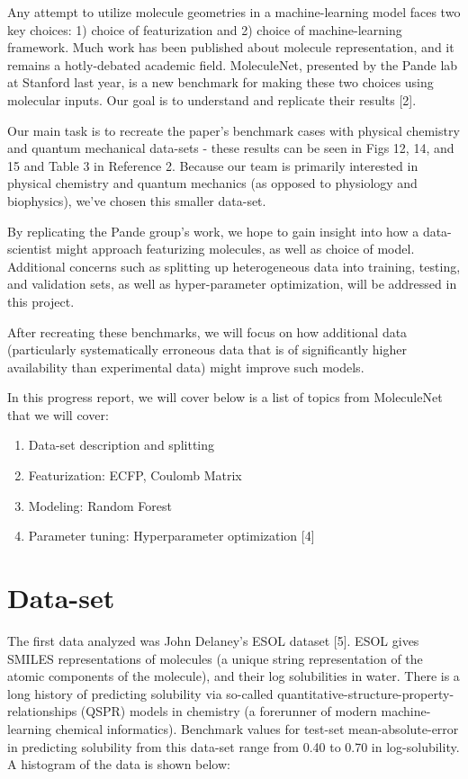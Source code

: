 \documentclass{article}
\begin{document}
Any attempt to utilize molecule geometries in a machine-learning model faces two key choices: 1) choice of featurization and 2) choice of machine-learning framework. Much work has been published about molecule representation, and it remains a hotly-debated academic field. MoleculeNet, presented by the Pande lab at Stanford last year, is a new benchmark for making these two choices using molecular inputs. Our goal is to understand and replicate their results [2].

Our main task is to recreate the paper's benchmark cases with physical chemistry and quantum mechanical data-sets - these results can be seen in Figs 12, 14, and 15 and Table 3 in Reference 2. Because our team is primarily interested in physical chemistry and quantum mechanics (as opposed to physiology and biophysics), we've chosen this smaller data-set.

By replicating the Pande group's work, we hope to gain insight into how a data-scientist might approach featurizing molecules, as well as choice of model. Additional concerns such as splitting up heterogeneous data into training, testing, and validation sets, as well as hyper-parameter optimization, will be addressed in this project.

After recreating these benchmarks, we will focus on how additional data (particularly systematically erroneous data that is of significantly higher availability than experimental data) might improve such models.

In this progress report, we will cover below is a list of topics from MoleculeNet that we will cover:
\begin{enumerate}
\item Data-set description and splitting
\item Featurization: ECFP, Coulomb Matrix
\item Modeling: Random Forest
\item Parameter tuning: Hyperparameter optimization [4]

\end{enumerate}

\section{Data-set}

The first data analyzed was John Delaney's ESOL dataset [5]. ESOL gives SMILES representations of molecules (a unique string representation of the atomic components of the molecule), and their log solubilities in water. There is a long history of predicting solubility via so-called quantitative-structure-property-relationships (QSPR) models in chemistry (a forerunner of modern machine-learning chemical informatics). Benchmark values for test-set mean-absolute-error in predicting solubility from this data-set range from 0.40 to 0.70 in log-solubility. A histogram of the data is shown below:
\end{document}
